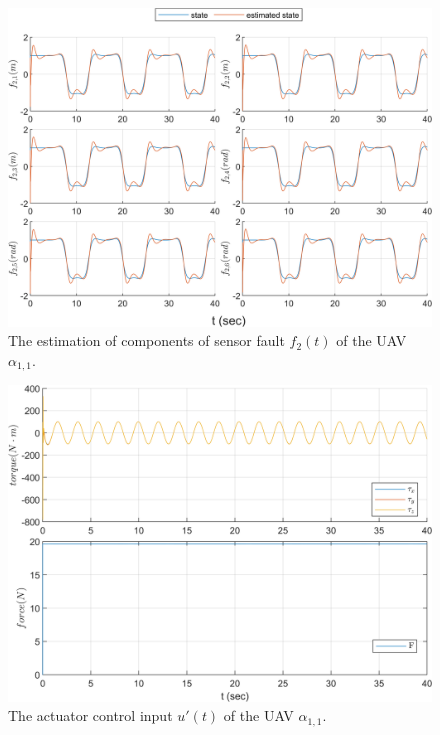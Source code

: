 \documentclass{ieeeaccess}
\begin{document}
\begin{figure}[htbp]
    \centering
    \includegraphics[scale=.57]{fig/uav (3).png}\caption{The estimation of components of sensor fault $f_2(t)$ of the UAV $\alpha_{1,1}$.}%
    \label{fig:UAV, fs}
\end{figure}
\begin{figure}[htbp]
    \centering
    \includegraphics[scale=.57]{fig/uav (4).png}\caption{The actuator control input $u'(t)$ of the UAV $\alpha_{1,1}$.}%
    \label{fig:UAV, control}
\end{figure}
\end{document}
